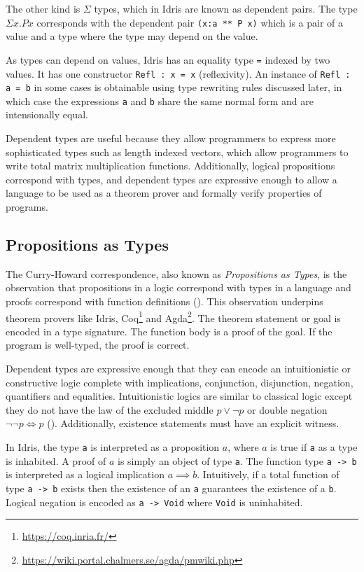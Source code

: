 \documentclass[11pt]{report}
\begin{document}
\begin{spacing}{1.15}
The other kind is $\Sigma$ types, which in Idris are known as dependent pairs. The type $\Sigma x.Px$ corresponds with the dependent pair \texttt{(x:a ** P x)} which is a pair of a value and a type where the type may depend on the value.

As types can depend on values, Idris has an equality type \texttt{=} indexed by two values. It has one constructor \texttt{Refl : x = x} (reflexivity). An instance of \texttt{Refl : a = b} in some cases is obtainable using type rewriting rules discussed later, in which case the expressions \texttt{a} and \texttt{b} share the same normal form and are intensionally equal.

Dependent types are useful because they allow programmers to express more sophisticated types such as length indexed vectors, which allow programmers to write total matrix multiplication functions. Additionally, logical propositions correspond with types, and dependent types are expressive enough to allow a language to be used as a theorem prover and formally verify properties of programs.

\subsection{Propositions as Types}

The Curry-Howard correspondence, also known as \textit{Propositions as Types}, is the observation that propositions in a logic correspond with types in a language and proofs correspond with function definitions (\cite{wadler2015propositions}). This observation underpins theorem provers like Idris, Coq\footnote{\href{https://coq.inria.fr/}{https://coq.inria.fr/}} and Agda\footnote{\href{https://wiki.portal.chalmers.se/agda/pmwiki.php}{https://wiki.portal.chalmers.se/agda/pmwiki.php}}. The theorem statement or goal is encoded in a type signature. The function body is a proof of the goal. If the program is well-typed, the proof is correct.

Dependent types are expressive enough that they can encode an intuitionistic or constructive logic complete with implications, conjunction, disjunction, negation, quantifiers and equalities. Intuitionistic logics are similar to classical logic except they do not have the law of the excluded middle $p\lor\neg p$ or double negation $\neg\neg p\Leftrightarrow p$ (\cite{moschovakis1999intuitionistic}). Additionally, existence statements must have an explicit witness.

In Idris, the type \texttt{a} is interpreted as a proposition $a$, where $a$ is true if \texttt{a} as a type is inhabited. A proof of $a$ is simply an object of type \texttt{a}. The function type \texttt{a -> b} is interpreted as a logical implication $a\implies b$. Intuitively, if a total function of type \texttt{a -> b} exists then the existence of an \texttt{a} guarantees the existence of a \texttt{b}. Logical negation is encoded as \texttt{a -> Void} where \texttt{Void} is uninhabited.


\end{spacing}
\end{document}
